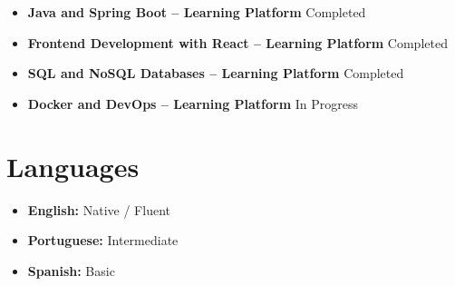 \documentclass[a4paper,10pt]{article}
\begin{document}
\begin{itemize}[itemsep=0.03em, topsep=0.08em]

    \item \textbf{Java and Spring Boot -- Learning Platform}
    \hfill
    Completed

    \item \textbf{Frontend Development with React -- Learning Platform}
    \hfill
    Completed

    \item \textbf{SQL and NoSQL Databases -- Learning Platform}
    \hfill
    Completed

    \item \textbf{Docker and DevOps -- Learning Platform}
    \hfill
    In Progress

\end{itemize}


\section{Languages}

\begin{itemize}[itemsep=0.03em, topsep=0.08em]

    \item \textbf{English:} Native / Fluent

    \item \textbf{Portuguese:} Intermediate

    \item \textbf{Spanish:} Basic

\end{itemize}
\end{document}

